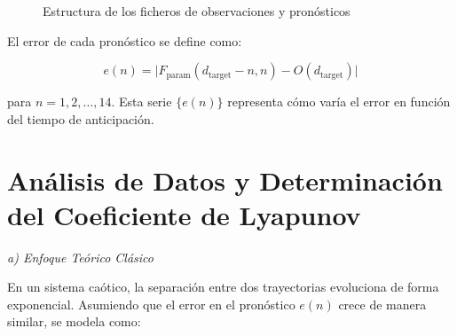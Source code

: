 \documentclass[
  10pt,
  a4paper,
  DIV=11,
  numbers=noendperiod,
  open=any]{scrreprt}
\numberwithin{equation}{chapter}
\numberwithin{equation}{section}
\renewcommand{\[}{\begin{equation}}
\renewcommand{\]}{\end{equation}}
\begin{document}
\begin{figure}[h]
  \centering
  \caption{Estructura de los ficheros de observaciones y pronósticos}
\end{figure}


El error de cada pronóstico se define como:

\begin{equation}
e(n) = \bigl| F_{\text{param}}(d_{\text{target}}-n, n) - O(d_{\text{target}}) \bigr|
\end{equation}

para \(n = 1,2,\dots,14\). Esta serie \(\{e(n)\}\) representa cómo varía
el error en función del tiempo de anticipación.

\section{Análisis de Datos y Determinación del Coeficiente de
Lyapunov}\label{anuxe1lisis-de-datos-y-determinaciuxf3n-del-coeficiente-de-lyapunov}

\emph{a) Enfoque Teórico Clásico}

En un sistema caótico, la separación entre dos trayectorias evoluciona
de forma exponencial. Asumiendo que el error en el pronóstico \(e(n)\)
crece de manera similar, se modela como:
\end{document}
